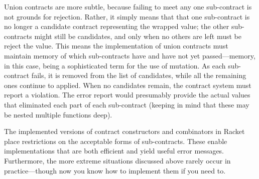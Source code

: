 Union contracts are more subtle, because failing to meet any one sub-contract is
not grounds for rejection. Rather, it simply means that that one sub-contract is
no longer a candidate contract representing the wrapped value; the other
sub-contracts might still be candidates, and only when no others are left must
be reject the value. This means the implementation of union contracts must
maintain memory of which sub-contracts have and have not yet passed—memory, in
this case, being a sophisticated term for the use of mutation. As each
sub-contract fails, it is removed from the list of candidates, while all the
remaining ones continue to applied. When no candidates remain, the contract
system must report a violation. The error report would presumably provide the
actual values that eliminated each part of each sub-contract (keeping in mind
that these may be nested multiple functions deep).

The implemented versions of contract constructors and combinators in Racket
place restrictions on the acceptable forms of sub-contracts. These enable
implementations that are both efficient and yield useful error messages.
Furthermore, the more extreme situations discussed above rarely occur in
practice—though now you know how to implement them if you need to.
